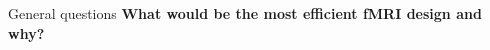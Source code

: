 \documentclass{beamer}
\begin{document}
%



\begin{frame}{General questions}
  \textbf{What would be the most efficient fMRI design and why?}

%
\end{frame}

%
%


%
\end{document}
